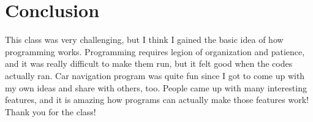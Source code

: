 \documentclass{article}
\begin{document}
\section{Conclusion}
This class was very challenging, but I think I gained the basic idea of how programming works. Programming requires legion of organization and patience, and it was really difficult to make them run, but it felt good when the codes actually ran.
Car navigation program was quite fun since I got to come up with my own ideas and share with others, too. People came up with many interesting features, and it is amazing how programs can actually make those features work!
Thank you for the class!
\end{document}
